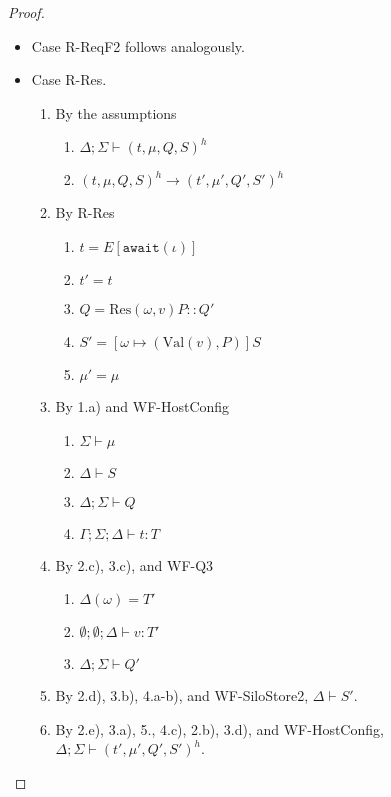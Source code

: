 \documentclass{article}
\theoremstyle{definition}
\newcommand{\Res}[2]{\text{Res}(#1, #2)}
\begin{document}
\begin{proof}
\begin{itemize}
\item Case R-ReqF2 follows analogously.

\item Case R-Res.
\begin{enumerate}
\item By the assumptions
  \begin{enumerate}[label=(\alph*)]
  \item $\Delta ; \Sigma \vdash (t, \mu, Q, S)^h$
  \item $(t, \mu, Q, S)^h \longrightarrow (t', \mu', Q', S')^h$
  \end{enumerate}
\item By R-Res
  \begin{enumerate}[label=(\alph*)]
  \item $t = E[\texttt{await}(\iota)]$
  \item $t' = t$
  \item $Q = {\Res \omega v P} :: Q'$
  \item $S' = [\omega \mapsto (\text{Val}(v), P)]S$
  \item $\mu' = \mu$
  \end{enumerate}
\item By 1.a) and WF-HostConfig
  \begin{enumerate}[label=(\alph*)]
  \item $\Sigma \vdash \mu$
  \item $\Delta \vdash S$
  \item $\Delta ; \Sigma \vdash Q$
  \item $\Gamma ; \Sigma ; \Delta \vdash t : T$
  \end{enumerate}
\item By 2.c), 3.c), and WF-Q3
  \begin{enumerate}[label=(\alph*)]
  \item $\Delta(\omega) = T'$
  \item $\emptyset ; \emptyset ; \Delta \vdash v : T'$
  \item $\Delta ; \Sigma \vdash Q'$
  \end{enumerate}
\item By 2.d), 3.b), 4.a-b), and WF-SiloStore2, $\Delta \vdash S'$.
\item By 2.e), 3.a), 5., 4.c), 2.b), 3.d), and WF-HostConfig, $\Delta ; \Sigma \vdash (t', \mu', Q', S')^h$.
\end{enumerate}


\end{itemize}
\end{proof}
\end{document}
